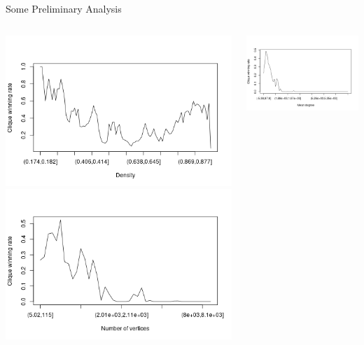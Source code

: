 \documentclass{beamer}
\begin{document}
\begin{frame}{Some Preliminary Analysis}
  \pause
  \begin{columns}
    \begin{column}{0.5\textwidth}
      \centering
      \includegraphics[width=\textwidth,height=0.4\textheight,keepaspectratio]{../dissertation/images/density_bins.png}
      \includegraphics[width=\textwidth,height=0.4\textheight,keepaspectratio]{../dissertation/images/vertices_bins.png}
    \end{column}
    \begin{column}{0.5\textwidth}
      \centering
      \includegraphics[width=\textwidth,height=0.4\textheight,keepaspectratio]{../dissertation/images/meandeg_bins.png}

\end{column}
\end{columns}
\end{frame}
\end{document}
